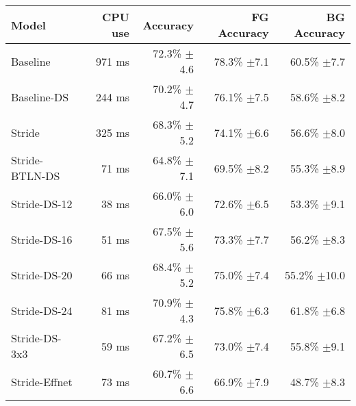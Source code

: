 \begin{tabular}{lrrrr}
\toprule
          Model & CPU use &     Accuracy &  FG Accuracy &   BG Accuracy \\
\midrule
       Baseline &  971 ms &  72.3\% $\pm$4.6 &  78.3\% $\pm$7.1 &   60.5\% $\pm$7.7 \\
    Baseline-DS &  244 ms &  70.2\% $\pm$4.7 &  76.1\% $\pm$7.5 &   58.6\% $\pm$8.2 \\
         Stride &  325 ms &  68.3\% $\pm$5.2 &  74.1\% $\pm$6.6 &   56.6\% $\pm$8.0 \\
 Stride-BTLN-DS &   71 ms &  64.8\% $\pm$7.1 &  69.5\% $\pm$8.2 &   55.3\% $\pm$8.9 \\
   Stride-DS-12 &   38 ms &  66.0\% $\pm$6.0 &  72.6\% $\pm$6.5 &   53.3\% $\pm$9.1 \\
   Stride-DS-16 &   51 ms &  67.5\% $\pm$5.6 &  73.3\% $\pm$7.7 &   56.2\% $\pm$8.3 \\
   Stride-DS-20 &   66 ms &  68.4\% $\pm$5.2 &  75.0\% $\pm$7.4 &  55.2\% $\pm$10.0 \\
   Stride-DS-24 &   81 ms &  70.9\% $\pm$4.3 &  75.8\% $\pm$6.3 &   61.8\% $\pm$6.8 \\
  Stride-DS-3x3 &   59 ms &  67.2\% $\pm$6.5 &  73.0\% $\pm$7.4 &   55.8\% $\pm$9.1 \\
  Stride-Effnet &   73 ms &  60.7\% $\pm$6.6 &  66.9\% $\pm$7.9 &   48.7\% $\pm$8.3 \\
\bottomrule
\end{tabular}
